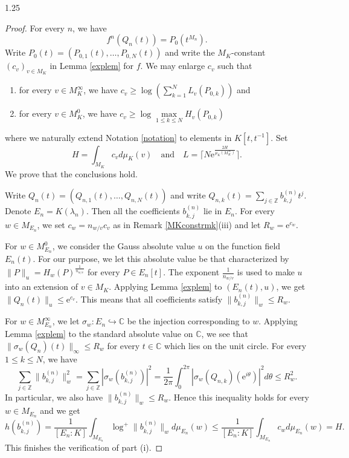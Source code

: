 \documentclass[12pt]{article}
\begin{document}
\begin{spacing}{1.25}
\begin{proof}
For every $n$, we have
$$
f^n(Q_n(t))=P_0(t^{M_n}).
$$
Write $P_0(t)=(P_{0,1}(t),\dots,P_{0,N}(t))$ and write the $M_K$-constant $(c_v)_{v\in M_K}$ in Lemma \ref{explem} for $f$. We may enlarge $c_v$ such that
\begin{enumerate}
\item
for every $v\in M_K^{\infty}$, we have $c_v\geq\log\left(\sum\limits_{k=1}^{N}L_v(P_{0,k})\right)$ and
\item
for every $v\in M_{K}^0$, we have $c_v\geq\log\max\limits_{1\leq k\leq N}H_v(P_{0,k})$
\end{enumerate}
where we naturally extend Notation \ref{notation} to elements in $K[t,t^{-1}]$. Set
$$
H=\int_{M_K}c_vd\mu_K(v)\quad\text{and}\quad L=\lceil N\mathrm{e}^{\frac{2H}{\mu_K(M_K^{\infty})}}\rceil.
$$
We prove that the conclusions hold.

Write $Q_n(t)=(Q_{n,1}(t),\dots,Q_{n,N}(t))$ and write $Q_{n,k}(t)=\sum\limits_{j\in\mathbb{Z}}b_{k,j}^{(n)}t^j$. Denote $E_n=K(\lambda_n)$. Then all the coefficients $b_{k,j}^{(n)}$ lie in $E_n$. For every $w\in M_{E_n}$, we set $c_w=n_{w/v}c_v$ as in Remark \ref{MKconstrmk}(iii) and let $R_w=\mathrm{e}^{c_w}$.

For $w\in M_{E_n}^0$, we consider the Gauss absolute value $u$ on the function field $E_n(t)$. For our purpose, we let this absolute value be that characterized by $\|P\|_u=H_w(P)^{\frac{1}{n_{w/v}}}$ for every $P\in E_n[t]$. The exponent $\frac{1}{n_{w/v}}$ is used to make $u$ into an extension of $v\in M_K$. Applying Lemma \ref{explem} to $(E_n(t),u)$, we get $\|Q_n(t)\|_u\leq\mathrm{e}^{c_v}$. This means that all coefficients satisfy $\|b_{k,j}^{(n)}\|_w\leq R_w$.

For $w\in M_{E_n}^{\infty}$, we let $\sigma_w\colon E_n\hookrightarrow\mathbb{C}$ be the injection corresponding to $w$. Applying Lemma \ref{explem} to the standard absolute value on $\mathbb{C}$, we see that $\|\sigma_w(Q_n)(t)\|_{\infty}\leq R_w$ for every $t\in\mathbb{C}$ which lies on the unit circle. For every $1\leq k\leq N$, we have
$$
\sum\limits_{j\in\mathbb{Z}}\|b_{k,j}^{(n)}\|_w^2=\sum\limits_{j\in\mathbb{Z}}|\sigma_w(b_{k,j}^{(n)})|^2=\frac{1}{2\pi}\int_{0}^{2\pi}|\sigma_w(Q_{n,k})(\mathrm{e}^{i\theta})|^2d\theta\leq R_w^2.
$$
In particular, we also have $\|b_{k,j}^{(n)}\|_w\leq R_w$. Hence this inequality holds for every $w\in M_{E_n}$ and we get
$$
h(b_{k,j}^{(n)})=\frac{1}{[E_n:K]}\int_{M_{E_n}}\log^+\|b_{k,j}^{(n)}\|_wd\mu_{E_n}(w)\leq\frac{1}{[E_n:K]}\int_{M_{E_n}}c_wd\mu_{E_n}(w)=H.
$$
This finishes the verification of part (i).


\end{proof}
\end{spacing}
\end{document}
